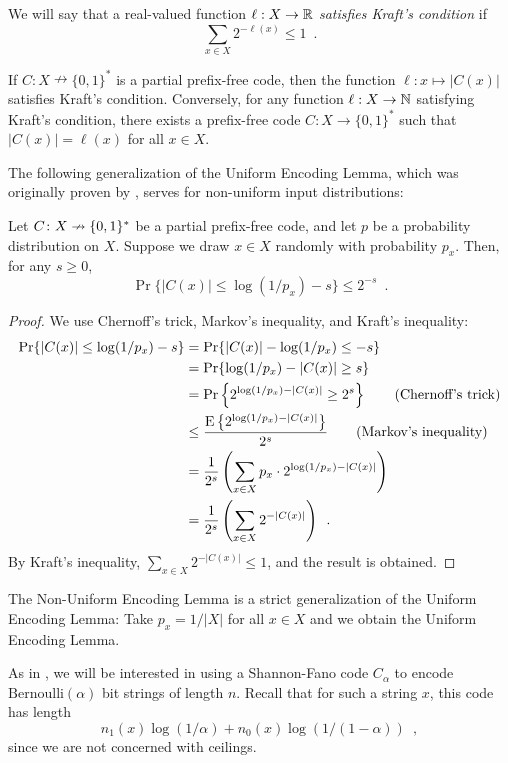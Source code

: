 \documentclass[format=acmsmall, review=false, screen=true]{acmart}
\begin{document}
We will say that a real-valued function $\ell : X \to \mathbb{R}$
\emph{satisfies Kraft's condition} if
\[
  \sum_{x \in X} 2^{-\ell(x)} \leq 1 \enspace .
\]
\begin{lem}
  If $C : X \nrightarrow \{0,1\}^*$ is a partial prefix-free code,
  then the function  $\ell : x \mapsto |C(x)|$ satisfies Kraft's condition. Conversely, for any
  function $\ell : X \to \mathbb{N}$ satisfying Kraft's condition, there
  exists a prefix-free code $C : X \to \{0, 1\}^*$ such that
  $|C(x)| = \ell(x)$ for all $x \in X$.
\end{lem}

The following generalization of the Uniform Encoding Lemma, which was
originally proven by ,
serves for non-uniform input distributions:
\begin{lem}  
  Let $C\colon X\nrightarrow\{0,1\}^*$ be a partial prefix-free code,
  and let $p$ be a probability distribution on $X$.  Suppose we draw
  $x \in X$ randomly with probability $p_x$.  Then, for any
  $s \geq 0$,
  \[
    \Pr\{ |C(x)| \le \log(1/p_x)-s\} \le 2^{-s} \enspace .
  \]
\end{lem}

\begin{proof}
  We use Chernoff's trick, Markov's inequality, and Kraft's
  inequality:
  \begin{align*}
    \Pr\{ |C(x)| \le\log(1/p_x)-s \}
    & = \Pr\{|C(x)| -\log(1/p_x) \le -s \} \\
    & = \Pr\{\log(1/p_x)-|C(x)| \ge s \} \\
    & = \Pr\left\{2^{\log(1/p_x)-|C(x)|} \ge 2^s \right\}  \tag{Chernoff's trick} \\
    & \le \frac{\operatorname{\mathrm{E}}\left\{2^{\log(1/p_x)-|C(x)|}\right\}}{2^s} \tag{Markov's inequality} \\
    & = \frac{1}{2^s} \left(\sum_{x\in X} p_x\cdot 2^{\log(1/p_x)-|C(x)|}\right) \\
    & = \frac{1}{2^s} \left(\sum_{x\in X}2^{-|C(x)|}\right) \enspace .
  \end{align*}
  By Kraft's inequality,
  $\sum_{x \in X} 2^{-|C(x)|} \leq 1$, and the result
  is obtained.
\end{proof}

The Non-Uniform Encoding Lemma is a strict generalization
of the Uniform Encoding Lemma: Take $p_x=1/|X|$ for all $x\in X$ and
we obtain the Uniform Encoding Lemma.

As in , we will be interested in using a
Shannon-Fano code $C_\alpha$ to encode $\mathrm{Bernoulli}(\alpha)$
bit strings of length $n$. Recall that for such a string $x$, this
code has length
\[
  n_1(x) \log (1/\alpha) + n_0(x) \log(1/(1 - \alpha)) \enspace ,
\]
since we are not concerned with ceilings.
\end{document}
